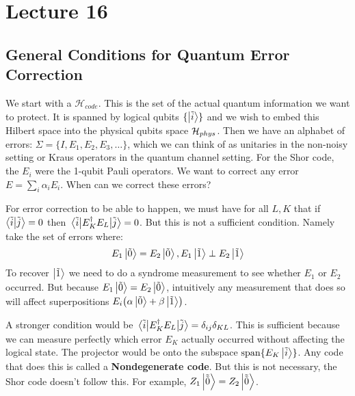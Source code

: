 \section{Lecture 16}

\subsection{General Conditions for Quantum Error Correction}
We start with a $\mathcal{H}_{code}$. This is the set of the actual quantum information
we want to protect. It is spanned by logical qubits $\{\ket{\tilde{i}}\}$ and we wish to embed this
Hilbert space into the physical qubits space $\operatorname{\mathcal{H}}_{phys}$. Then we have an alphabet of errors:
$\Sigma = \{ I, E_1, E_2, E_3, \dots \}$, which we can think of as unitaries in the non-noisy setting or Kraus operators
in the quantum channel setting. For the Shor code, the $E_i$ were the 1-qubit Pauli operators. We
want to correct any error $E = \sum_i \alpha_i E_i$. When can we correct these errors?

For error correction to be able to happen,
we must have for all $L, K$ that if $\braket{\tilde{i}}{\tilde{j}} = 0$
then $\mel{\tilde{i}}{E_K^{\dagger} E_L}{\tilde{j}} = 0$. But this is not a sufficient condition. Namely
take the set of errors where:
\[ E_1 \ket{\tilde{0}} = E_2 \ket{\tilde{0}}, E_1 \ket{\tilde{1}} \perp E_2 \ket{\tilde{1}} \]
To recover $\ket{\tilde{1}}$ we need to do a syndrome measurement to see whether $E_1$ or $E_2$ occurred.
But because $E_1 \ket{\tilde{0}} = E_2 \ket{\tilde{0}}$, intuitively any measurement that does so will affect superpositions
$E_i\qty(\alpha \ket{\tilde{0}} + \beta \ket{\tilde{1}})$.

A stronger condition would be $ \mel{\tilde{i}}{E_K^{\dagger} E_L}{\tilde{j}} = \delta_{ij} \delta_{KL}$.
This is sufficient because we can measure perfectly which error $E_K$ actually occurred without affecting the logical state.
The projector would be onto the subspace $\textrm{span}\{E_K \ket{\tilde{i}}\}$. Any code that does this is called a 
\textbf{Nondegenerate code}.
But this is not necessary,
the Shor code doesn't follow this. For example, $Z_1 \ket{\tilde{\tilde{0}}} = Z_2 \ket{\tilde{\tilde{0}}}$. 

